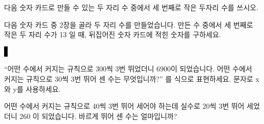 \documentclass[a4paper,15pt]{exam}
\begin{document}
\begin{questions}

\newpage

\question
    다음 숫자 카드로 만들 수 있는 두 자리 수 중에서 세 번째로 작은 두자리 수를 쓰시오.
    
    \begin{center}
           
    \end{center}



\question
    다음 숫자 카드 중 2장을 골라 두 자리 수를 만들었습니다. 만든 수 중에서 세 번째로 작은 두 자리 수가 13 일 때, 뒤집어진 숫자 카드에 적힌 숫자를 구하세요.
    
    \begin{center}
          \colorbox{black}{0} 
    \end{center}



\question
    \enquote{어떤 수에서 커지는 규칙으로 300씩 3번 뛰었더니 6900이 되었습니다. 어떤 수에서 커지는 규칙으로 30씩 3번 뛰어 센 수는 무엇입니까?} 를 식으로 표현하세요. 문자로 x와 y를 사용하세요.

\question
    어떤 수에서 커지는 규칙으로 40씩 3번 뛰어 세어야 하는데 실수로 20씩 3번 뛰어 세었더니 260 이 되었습니다. 바르게 뛰어 센 수는 얼마입니까?


\end{questions}
\end{document}
